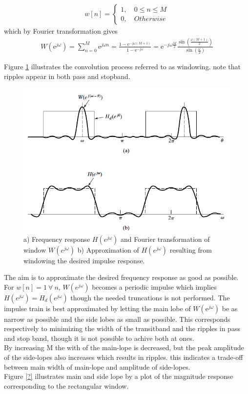 \begin{align}
w[n] =
\left\{ \begin{matrix}
1, &\ 0 \leq n \leq M \\
0, &\ Otherwise
\end{matrix}\right.
\end{align}
which by Fourier transformation gives 
\begin{align}
W \left(\text{e}^{j\omega}\right)=\sum_{n=0}^{M} \text{e}^{j\omega n} = \frac{1- \text{e}^{-j\omega(M+1)}}{1- \text{e}^{-j\omega}} = \text{e}^{-j\omega \frac{M}{2}} \frac{ \sin \left( \frac{\omega \left( M+1 \right)}{2} \right)}{\sin \left( \frac{\omega}{2} \right)} 
\end{align}

Figure \ref{fig:FIR1} illustrates the convolution process referred to as windowing. note that ripples appear in both pass and stopband. 
\begin{figure}[H]
    \centering
    \includegraphics[scale=0.4]{figures/FIR1.png}
    \caption{a) Frequency response $H(e^{j\omega})$ and Fourier transformation of window $W(e^{j\omega})$ b) Approximation of $H(e^{j\omega})$ resulting from windowing the desired impulse response.}
    \label{fig:FIR1}
\end{figure}  
The aim is to approximate the desired frequency response as good as possible. For $w[n]=1 \ \forall \ n$, $W(e^{j\omega})$ becomes a periodic impulse which implies $H(e^{j\omega})=H_d(e^{j\omega})$ though the needed truncations is not performed. The impulse train is best approximated by letting the main lobe of $W(\text{e}^{j\omega})$ be as narrow as possible and the side lobes as small as possible. This corresponds respectively to minimizing the width of the transitband and the ripples in pass and stop band, though it is not possible to achive both at ones.\\
By increasing M the with of the main-lope is decreased, but the peak amplitude of the side-lopes also increases which results in ripples. this indicates a trade-off between main width of main-lope and amplitude of side-lopes. \\
Figure \ref{?} illustrates main and side lope by a plot of the magnitude response corresponding to the rectangular window.

